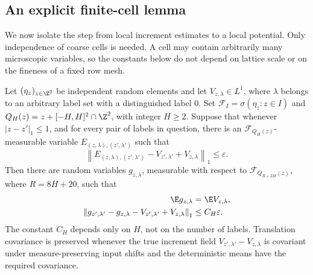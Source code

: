 \subsection{An explicit finite-cell lemma}

We now isolate the step from local increment estimates to a local
potential.  Only independence of coarse cells is needed.  A cell may
contain arbitrarily many microscopic variables, so the constants below
do not depend on lattice scale or on the fineness of a fixed row mesh.

\begin{lemma}
\label{found:lem-finite-cell}
Let $(\eta_z)_{z\in\Z^2}$ be independent random elements and let
$V_{z,\lambda}\in L^1$, where $\lambda$ belongs to an arbitrary label
set with a distinguished label $0$.  Set
$\mathcal F_I=\sigma(\eta_z:z\in I)$ and
$Q_H(z)=z+[-H,H]^2\cap\Z^2$, with integer $H\geq2$.
Suppose that whenever $|z-z'|_1\leq1$, and for every pair of labels
in question, there is an $\mathcal F_{Q_H(z)}$-measurable variable
$E_{(z,\lambda),(z',\lambda')}$ such that
\begin{equation}
 \left\|E_{(z,\lambda),(z',\lambda')}
       -V_{z',\lambda'}+V_{z,\lambda}\right\|_1
 \leq\varepsilon.                              \label{found:eq-abstract-hyp}
\end{equation}
Then there are random variables $g_{z,\lambda}$, measurable with respect
to $\mathcal F_{Q_{R+2H}(z)}$, where $R=8H+20$, such that
\begin{align}
 \E g_{z,\lambda}&=\E V_{z,\lambda},\label{found:eq-mean}\\
 \left\|g_{z',\lambda'}-g_{z,\lambda}
       -V_{z',\lambda'}+V_{z,\lambda}\right\|_1
 &\leq C_H\varepsilon.                         \label{found:eq-potential}
\end{align}
The constant $C_H$ depends only on $H$, not on the number of labels.
Translation covariance is preserved whenever the true increment field
$V_{z',\lambda'}-V_{z,\lambda}$ is covariant under measure-preserving input shifts
and the deterministic means have the required covariance.
\end{lemma}

